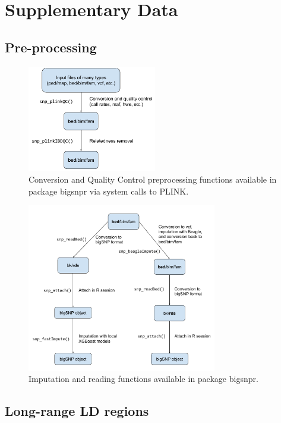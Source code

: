 \documentclass[a4paper, 11pt]{article}
\begin{document}
\section{Supplementary Data}

\renewcommand{\thefigure}{S\arabic{figure}}
\setcounter{figure}{0}
\renewcommand{\thetable}{S\arabic{table}}
\setcounter{table}{0}

\subsection{Pre-processing}

\begin{figure}[htpb]
\centerline{\includegraphics[width=160pt]{conversion-QC.pdf}}
\caption{Conversion and Quality Control preprocessing functions available in package bigsnpr via system calls to PLINK.}\label{fig:qc}
\end{figure}

\begin{figure}[htpb]
\centerline{\includegraphics[width=235pt]{imputation.pdf}}
\caption{Imputation and reading functions available in package bigsnpr.}\label{fig:impute}
\end{figure}


\subsection{Long-range LD regions}
\end{document}
